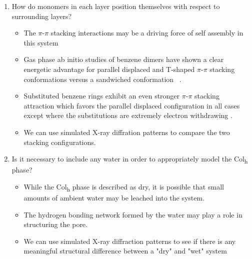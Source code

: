 \documentclass{article}
\begin{document}
\begin{enumerate}
   \item How do monomers in each layer position themselves with respect to surrounding 
   layers? \label{point:orientation}
   \begin{itemize}
      \item The $\pi$-$\pi$ stacking interactions may be a driving force of self assembly 
      in this system\cite{gazit_possible_2002} %
      \item Gas phase ab initio studies of benzene dimers have shown a clear energetic
      advantage for parallel displaced and T-shaped $\pi$-$\pi$ stacking conformations versus a
      sandwiched conformation ~\cite{sinnokrot_estimates_2002}.
      \item Substituted benzene rings exhibit an even stronger $\pi$-$\pi$ stacking 
      attraction which favors the parallel displaced configuration in all cases
      except where the substitutions are extremely electron withdrawing
      \cite{waller_hybrid_2006,ringer_effect_2006}.
      \item We can use simulated X-ray diffration patterns to compare the two 
      stacking configurations. 
   \end{itemize}

   \item Is it necessary to include any water in order to appropriately model the 
   Col\textsubscript{h} phase? \label{point:water}
   \begin{itemize}
	\item While the Col\textsubscript{h} phase is described as dry, it is 
	possible that small amounts of ambient water may be leached into the system.
	\item The hydrogen bonding network formed by the water may play a role 
        in structuring the pore.
	\item We can use simulated X-ray diffraction patterns to see if there is
        any meaningful structural difference between a "dry" and "wet" system
   \end{itemize}
    \end{enumerate}

\end{document}
